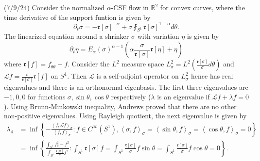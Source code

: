 \documentclass[12pt,a4paper]{article}
\newcommand{\R}{\mathbb{R}}
\begin{document}
(7/9/24) Consider the normalized $ \alpha $-CSF flow in $ \R^{2} $ for convex curves, where the time derivative of the support funtion is given by 
\[ \partial_{t}\sigma = - \mathfrak{r}[\sigma]^{-\alpha}+ \sigma\fint_{S^{1}} \mathfrak{r}[\sigma]^{1-\alpha}d \theta.\]
The linearized equation around a shrinker $ \sigma $ with variation $ \eta $ is given by 
\[ \partial_{t} \eta  = E_{\alpha}(\sigma)^{\alpha-1}\left(\alpha \frac{\sigma}{ \mathfrak{r}[\sigma]} \mathfrak{r}[\eta]+ \eta\right)\]
where $ \mathfrak{r}[f] = f_{\theta \theta}+f $. Consider the $ L^{2} $ measure space $ L^{2}_{\sigma} = L^{2}( \frac{\mathfrak{r}[\sigma]}{\sigma}d \theta ) $ and $ \mathcal{L}f = \frac{\sigma}{ \mathfrak{r}[\sigma]} \mathfrak{r}[f] $ on $ S^{1} $. Then $ \mathcal{L} $ is a self-adjoint operator on $ L^{2}_{\sigma} $ hence has real eigenvalues and there is an orthonormal eigenbasis. The first three eigenvalues are $ -1, 0, 0 $ for functions $ \sigma, \sin \theta, \cos \theta $ respectively ($ \lambda $ is an eigenvalue if $ \mathcal{L}f+ \lambda f = 0 $). Using Brunn-Minkowski inequality, Andrews proved that there are no other non-positive eigenvalues. Using Rayleigh quotient, the next eigenvalue is given by 
\begin{align*}
   \lambda_{4} &  = \inf \left\{ - \frac{\left< f, \mathcal{L}f \right>_{\sigma}}{ \left< f,f \right>_{\sigma}} : f \in C^{\infty}(S^{1}), \left< \sigma, f \right>_{\sigma} = \left< \sin \theta, f \right>_{\sigma} = \left< \cos \theta, f \right>_{\sigma} = 0\right\} \\
   & = \inf \left\{ \frac{\int_{S^{1}}f_{\theta}^{2}-f^{2}}{\int_{S^{1}} \frac{ \mathfrak{r}[\sigma]}{\sigma}f^{2}} : \int_{S^{1}} \mathfrak{r}[\sigma]f = \int_{S^{1}} \frac{ \mathfrak{r}[\sigma]}{\sigma}f \sin \theta = \int_{S^{1}} \frac{ \mathfrak{r}[\sigma]}{\sigma}f \cos \theta = 0 \right\}.
\end{align*}
\end{document}
